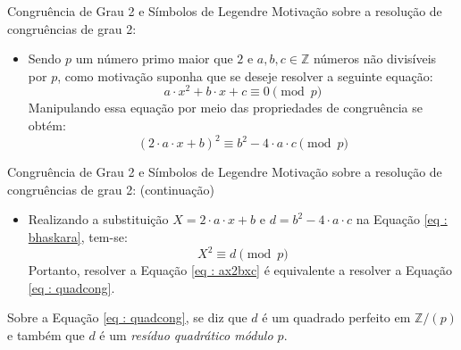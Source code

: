 \begin{frame}[fragile]{Congruência de Grau 2 e Símbolos de Legendre}
    Motivação sobre a resolução de congruências de grau 2:
    \vspace{4mm}
    \begin{itemize}
        \item Sendo $p$ um número primo maior que $2$ e $a,b,c \in \mathbb{Z}$ números não divisíveis por $p$, como motivação suponha que se deseje resolver a seguinte equação:
        \begin{equation} \label{eq : ax2bxc}
            a \cdot x^2 + b \cdot x + c \equiv 0 \pmod p
        \end{equation}
        Manipulando essa equação por meio das propriedades de congruência se obtém:
        \begin{equation} \label{eq : bhaskara}
            (2 \cdot a \cdot x + b)^2 \equiv b^2 - 4 \cdot a \cdot c \pmod p
        \end{equation}
    \end{itemize}
\end{frame}

\begin{frame}[fragile]{Congruência de Grau 2 e Símbolos de Legendre}
    Motivação sobre a resolução de congruências de grau 2: 
    (continuação)
    \vspace{4mm}
    \begin{itemize}
        \item Realizando a substituição $X = 2 \cdot a \cdot x + b$ e $d = b^2 - 4 \cdot a \cdot c$ na Equação \ref{eq : bhaskara}, tem-se:
        \begin{equation} \label{eq : quadcong}
            X^2 \equiv d \pmod p
        \end{equation}
        Portanto, resolver a Equação \ref{eq : ax2bxc} é equivalente a resolver a Equação \ref{eq : quadcong}.
    \end{itemize}
    \vspace{4mm}
    Sobre a Equação \ref{eq : quadcong}, se diz que $d$ é um quadrado perfeito em $\mathbb{Z}/(p)$ e também que $d$ é um \textit{resíduo quadrático módulo $p$}.

\end{frame}



